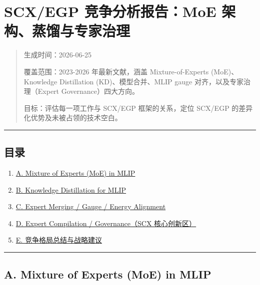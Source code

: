 \documentclass[
  12pt,
]{ctexart}
\author{SCX}
\date{2026}
\providecommand{\tightlist}{%
  \setlength{\itemsep}{0pt}\setlength{\parskip}{0pt}}
\begin{document}
\section{SCX/EGP 竞争分析报告：MoE
架构、蒸馏与专家治理}\label{scxegp-ux7adeux4e89ux5206ux6790ux62a5ux544amoe-ux67b6ux6784ux84b8ux998fux4e0eux4e13ux5bb6ux6cbbux7406}

\begin{quote}
生成时间：2026-06-25

覆盖范围：2023-2026 年最新文献，涵盖 Mixture-of-Experts (MoE)、Knowledge
Distillation (KD)、模型合并、MLIP gauge 对齐，以及专家治理（Expert
Governance）四大方向。

目标：评估每一项工作与 SCX/EGP 框架的关系，定位 SCX/EGP
的差异化优势及未被占领的技术空白。
\end{quote}

\begin{center}\rule{0.5\linewidth}{0.5pt}\end{center}

\subsection{目录}\label{ux76eeux5f55}

\begin{enumerate}
\def\labelenumi{\arabic{enumi}.}
\tightlist
\item
  \hyperref[a-mixture-of-experts-moe-in-mlip]{A. Mixture of Experts
  (MoE) in MLIP}
\item
  \hyperref[b-knowledge-distillation-for-mlip]{B. Knowledge Distillation
  for MLIP}
\item
  \hyperref[c-expert-merging--gauge--energy-alignment]{C. Expert Merging
  / Gauge / Energy Alignment}
\item
  \hyperref[d-expert-compilation--governancescx-ux6838ux5fc3ux521bux65b0ux533a]{D.
  Expert Compilation / Governance（SCX 核心创新区）}
\item
  \hyperref[e-ux7adeux4e89ux683cux5c40ux603bux7ed3ux4e0eux6218ux7565ux5efaux8bae]{E.
  竞争格局总结与战略建议}
\end{enumerate}

\begin{center}\rule{0.5\linewidth}{0.5pt}\end{center}

\subsection{A. Mixture of Experts (MoE) in
MLIP}\label{a.-mixture-of-experts-moe-in-mlip}
\end{document}
